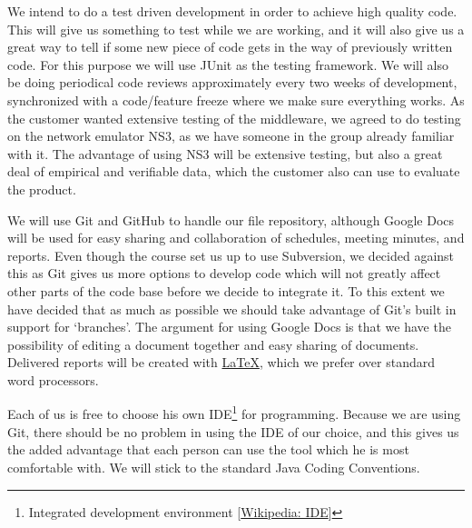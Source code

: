 \documentclass[12pt]{article}
\begin{document}
    We  intend to do a test driven development in order to achieve high quality code. This will give us something to test while we are working, and it will also give us a great way to tell if some new piece of code gets in the way of previously written code. For this purpose we will use JUnit as the testing framework. We will also be doing periodical code reviews approximately every two weeks of development, synchronized with a code/feature freeze where we make sure everything works. As the customer wanted extensive testing of the middleware, we agreed to do testing on the network emulator NS3, as we have someone in the group already familiar with it. The advantage of using NS3 will be extensive testing, but also a great deal of empirical and verifiable data, which the customer also can use to evaluate the product.

    We will use Git and GitHub to handle our file repository, although Google Docs will be used for easy sharing and collaboration of schedules, meeting minutes, and reports. Even though the course set us up to use Subversion, we decided against this as Git gives us more options to develop code which will not greatly affect other parts of the code base before we decide to integrate it. To this extent we have decided that as much as possible we should take advantage of Git’s built in support for ‘branches’. The argument for using Google Docs is that we have the possibility of editing a document together and easy sharing of documents. Delivered reports will be created with \href{http://www.latex-project.org/}{\LaTeX}, which we prefer over standard word processors.

    Each of us is free to choose his own IDE\footnote
        {Integrated development environment [\href{http://en.wikipedia.org/wiki/Integrated_development_environment}{Wikipedia: IDE}]} for programming. Because we are using Git, there should be no problem in using the IDE of our choice, and this gives us the added advantage that each person can use the tool which he is most comfortable with. We will stick to the standard Java Coding Conventions.
    
\end{document}
